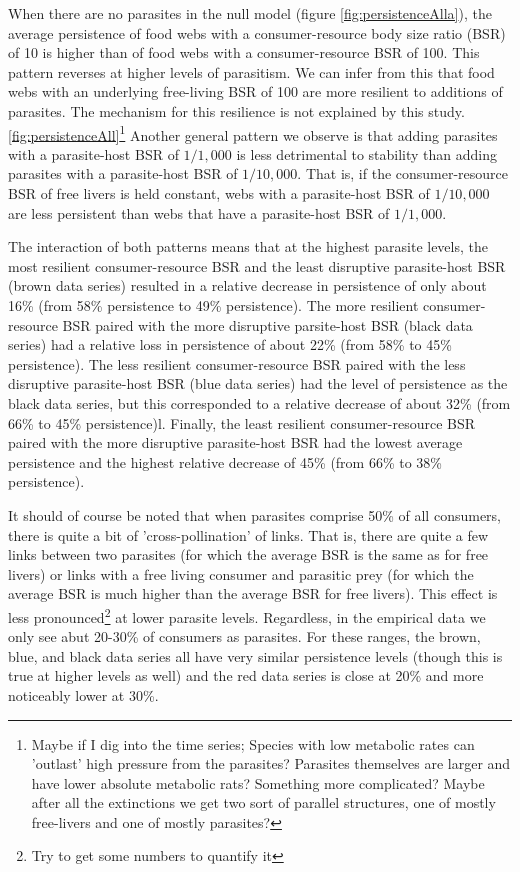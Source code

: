 \documentclass[11pt]{amsart}
\begin{document}
When there are no parasites in the null model (figure \ref{fig:persistenceAlla}), the average persistence of food webs with a consumer-resource body size ratio (BSR) of 10 is higher than of food webs with a consumer-resource BSR of 100.  This pattern reverses at higher levels of parasitism.  We can infer from this that food webs with an underlying free-living BSR of 100 are more resilient to additions of parasites.  The mechanism for this resilience is not explained by this study.\ref{fig:persistenceAll}\footnote{Maybe if I dig into the time series;  Species with low metabolic rates can 'outlast' high pressure from the parasites? Parasites themselves are larger and have lower absolute metabolic rats? Something more complicated?  Maybe after all the extinctions we get two sort of parallel structures, one of mostly free-livers and one of mostly parasites?}   Another general pattern we observe is that adding parasites with a parasite-host BSR of $1/1,000$ is less detrimental to stability than adding parasites with a parasite-host BSR of $1/10,000$.  That is, if the consumer-resource BSR of free livers is held constant, webs with a parasite-host BSR of $1/10,000$ are less persistent than webs that have a parasite-host BSR of $1/1,000$.


The interaction of both patterns means that at the highest parasite levels, the most resilient consumer-resource BSR and the least disruptive parasite-host BSR (brown data series) resulted in a relative decrease in persistence of only about 16\% (from 58\% persistence to 49\% persistence).  The more resilient consumer-resource BSR paired with the more disruptive parsite-host BSR (black data series) had a relative loss in persistence of about 22\% (from 58\% to 45\% persistence). The less resilient consumer-resource BSR paired with the less disruptive parasite-host BSR (blue data series) had the level of persistence as the black data series, but this corresponded to a relative decrease of about 32\% (from 66\% to 45\% persistence)l.  Finally, the least resilient consumer-resource BSR paired with the more disruptive parasite-host BSR had the lowest average persistence and the highest relative decrease of 45\% (from 66\% to 38\% persistence). 

It should of course be noted that when parasites comprise 50\% of all consumers, there is quite a bit of 'cross-pollination' of links.  That is, there are quite a few links between two parasites (for which the average BSR is the same as for free livers) or links with a free living consumer and parasitic prey (for which the average BSR is much higher than the average BSR for free livers).  This effect is less pronounced\footnote{Try to get some numbers to quantify it} at lower parasite levels.  Regardless, in the empirical data we only see abut 20-30\% of consumers as parasites.  For these ranges, the brown, blue, and black data series all have very similar persistence levels (though this is true at higher levels as well) and the red data series is close at 20\% and more noticeably lower at 30\%.
\end{document}
